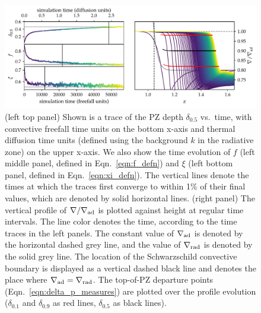 \documentclass[twocolumn]{aastex631}
\newcommand{\gradrad}{\ensuremath{\nabla_{\rm{rad}}}}
\newcommand{\gradad}{\ensuremath{\nabla_{\rm{ad}}}}
\newcommand{\justgrad}{\ensuremath{\nabla}}
\begin{document}
\begin{figure}[t]
\centering
\includegraphics[width=\textwidth]{time_evolution.pdf}
\caption{
(left top panel) Shown is a trace of the PZ depth $\delta_{0.5}$ vs.~time, with convective freefall time units on the bottom x-axis and thermal diffusion time units (defined using the background $k$ in the radiative zone) on the upper x-axis.
We also show the time evolution of $f$ (left middle panel, defined in Eqn.~\ref{eqn:f_defn}) and $\xi$ (left bottom panel, defined in Eqn.~\ref{eqn:xi_defn}).
The vertical lines denote the times at which the traces first converge to within 1\% of their final values, which are denoted by solid horizontal lines.
(right panel) The vertical profile of $\justgrad/\gradad$ is plotted against height at regular time intervals.
The line color denotes the time, according to the time traces in the left panels.
The constant value of $\gradad$ is denoted by the horizontal dashed grey line, and the value of $\gradrad$ is denoted by the solid grey line.
The location of the Schwarzschild convective boundary is displayed as a vertical dashed black line and denotes the place where $\gradad = \gradrad$.
The top-of-PZ departure points (Eqn.~\ref{eqn:delta_p_measures}) are plotted over the profile evolution ($\delta_{0.1}$ and $\delta_{0.9}$ as red lines, $\delta_{0.5}$ as black lines).
\label{fig:time_evolution}
}
\end{figure}
\end{document}
